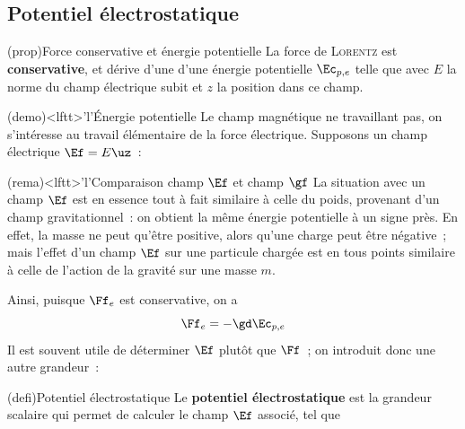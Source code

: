 \documentclass[../../main/main.tex]{subfiles}
\begin{document}
\subsection{Potentiel électrostatique}
\begin{tcb*}(prop){Force conservative et énergie potentielle}
	La force de \textsc{Lorentz} est \textbf{conservative}, et dérive d'une
	d'une énergie potentielle $\Ec_{p,e}$ telle que
	\psw{\[\Ec_{p,e} = -qEz\]}
	avec $E$ la norme du champ électrique subit et $z$ la position dans ce
	champ.
\end{tcb*}
\begin{tcb*}(demo)<lftt>'l'{Énergie potentielle}
	Le champ magnétique ne travaillant pas, on s'intéresse au travail
	élémentaire de la force électrique. Supposons un champ électrique $\Ef =
		E\uz$~:
	\hqed
\end{tcb*}

\begin{tcb*}(rema)<lftt>'l'{Comparaison champ $\protect\Ef$ et champ
	$\protect\gf$}
	La situation avec un champ $\Ef$ est en essence tout à fait similaire à
	celle du poids, provenant d'un champ gravitationnel~: on obtient la même
	énergie potentielle à un signe près. En effet, la masse ne peut qu'être
	positive, alors qu'une charge peut être négative~; mais l'effet d'un champ
	$\Ef$ sur une particule chargée est en tous points similaire à celle de
	l'action de la gravité sur une masse $m$.
\end{tcb*}

Ainsi, puisque $\Ff_e$ est conservative, on a
\[\Ff_e = -\gd\Ec_{p,e}\]
Il est souvent utile de déterminer $\Ef$ plutôt que $\Ff$~; on introduit donc
une autre grandeur~:

\begin{tcb*}(defi){Potentiel électrostatique}
	Le \textbf{potentiel électrostatique} est la grandeur scalaire qui permet de
	calculer le champ $\Ef$ associé, tel que
	\psw{
		\[
			\boxed{V = \frac{\Ec_{p,e}}{q}}
			\quad\Ra\quad
			\Ef = -\gd V
		\]
	}
\end{tcb*}
\end{document}
